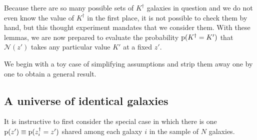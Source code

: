 
Because there are so many possible sets of $K^{\dagger}$ galaxies in question and we do not even know the value of $K^{\dagger}$ in the first place, it is not possible to check them by hand, but this thought experiment mandates that we consider them.
With these lemmas, we are now prepared to evaluate the  probability ${\mathrm{p}(K^{{\dagger}} = K')}$ that $\mathcal{N}(z')$ takes any particular value $K'$ at a fixed $z'$.

We begin with a toy case of simplifying assumptions and strip them away one by one to obtain a general result.

\subsection{A universe of identical galaxies}

It is instructive to first consider the special case in which there is one \pzpdf\ ${\mathrm{p}(z') \equiv \mathrm{p}(z_{i}^{\dagger} = z')}$ shared among each galaxy $i$ in the sample of $N$ galaxies.

